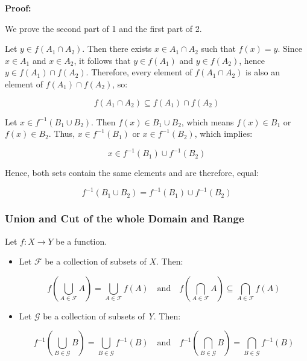 \textbf{Proof:}

We prove the second part of 1 and the first part of 2.
\vspace{\baselineskip}

Let \( y \in f(A_1 \cap A_2) \). Then there exists \( x \in A_1 \cap A_2 \) such that 
\( f(x) = y \). Since \( x \in A_1 \) and \( x \in A_2 \), it follows that \( y \in f(A_1) \) 
and \( y \in f(A_2) \), hence \( y \in f(A_1) \cap f(A_2) \). Therefore, every element of 
\( f(A_1 \cap A_2) \) is also an element of \( f(A_1) \cap f(A_2) \), so:

\[
	f(A_1 \cap A_2) \subseteq f(A_1) \cap f(A_2)
\]

Let \( x \in f^{-1} (B_1 \cup B_2) \). Then \( f(x) \in B_1 \cup B_2 \), which means \( f(x) \in B_1 \) 
or \( f(x) \in B_2 \). Thus, \( x \in f^{-1}(B_1) \) 
or \( x \in f^{-1}(B_2) \), which implies:
	      
\[
	 x \in f^{-1}(B_1) \cup f^{-1}(B_2)
\]

Hence, both sets contain the same elements and are therefore, equal:
	      
\[
	f^{-1}(B_1 \cup B_2) = f^{-1}(B_1) \cup f^{-1}(B_2)
\]

\QED

\subsubsection{Union and Cut of the whole Domain and Range}

Let \( f : X \to Y \) be a function.

\begin{itemize}

	\item Let \( \mathcal{F} \) be a collection of subsets of \(X\). Then:

   	      \[
		      f\left( \bigcup_{A \in \mathcal{F}} A \right) = \bigcup_{A \in \mathcal{F}} f(A)
		      \quad \text{and} \quad
		      f\left( \bigcap_{A \in \mathcal{F}} A \right) \subseteq \bigcap_{A \in \mathcal{F}} f(A)
	      \]

	\item Let \( \mathcal{G} \) be a collection of subsets of \emph{Y}. Then:

	      \[
		      f^{-1}\left( \bigcup_{B \in \mathcal{G}} B \right) = \bigcup_{B \in \mathcal{G}} f^{-1}(B)
		      \quad \text{and} \quad
		      f^{-1}\left( \bigcap_{B \in \mathcal{G}} B \right) = \bigcap_{B \in \mathcal{G}} f^{-1}(B)
	      \]

\end{itemize}

